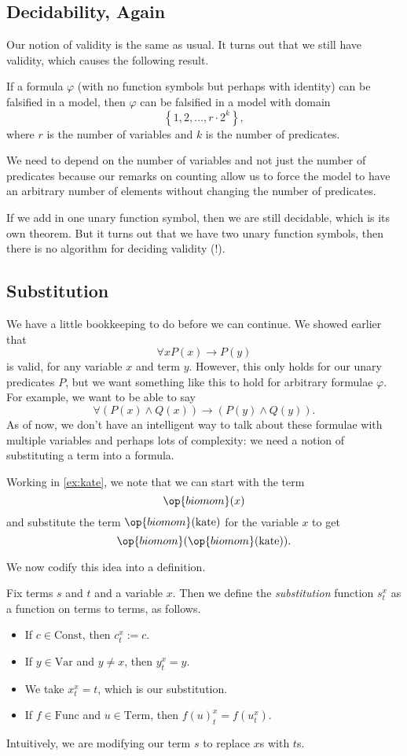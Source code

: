 \subsection{Decidability, Again}
Our notion of validity is the same as usual. It turns out that we still have validity, which causes the following result.
\begin{lemma}
	If a formula $\varphi$ (with no function symbols but perhaps with identity) can be falsified in a model, then $\varphi$ can be falsified in a model with domain
	\[\left\{1,2,\ldots,r\cdot 2^k\right\},\]
	where $r$ is the number of variables and $k$ is the number of predicates.
\end{lemma}
\begin{remark}
	We need to depend on the number of variables and not just the number of predicates because our remarks on counting allow us to force the model to have an arbitrary number of elements without changing the number of predicates.
\end{remark}
If we add in one unary function symbol, then we are still decidable, which is its own theorem. But it turns out that we have two unary function symbols, then there is no algorithm for deciding validity (!).

\subsection{Substitution}
We have a little bookkeeping to do before we can continue. We showed earlier that
\[\forall xP(x)\to P(y)\]
is valid, for any variable $x$ and term $y$. However, this only holds for our unary predicates $P$, but we want something like this to hold for arbitrary formulae $\varphi$. For example, we want to be able to say
\[\forall(P(x)\land Q(x))\to(P(y)\land Q(y)).\]
As of now, we don't have an intelligent way to talk about these formulae with multiple variables and perhaps lots of complexity: we need a notion of substituting a term into a formula.
\begin{example}
	Working in \autoref{ex:kate}, we note that we can start with the term
	\[\op{biomom}(x)\]
	and substitute the term $\op{biomom}(\mathrm{kate})$ for the variable $x$ to get
	\[\op{biomom}(\op{biomom}(\mathrm{kate})).\]
\end{example}
We now codify this idea into a definition.
\begin{definition}[Substitution]
	Fix terms $s$ and $t$ and a variable $x$. Then we define the \textit{substitution} function $s_t^x$ as a function on terms to terms, as follows.
	\begin{itemize}
		\item If $c\in\mathrm{Const}$, then $c^x_t:=c$.
		\item If $y\in\mathrm{Var}$ and $y\ne x$, then $y^x_t=y$.
		\item We take $x^x_t=t$, which is our substitution.
		\item If $f\in\mathrm{Func}$ and $u\in\mathrm{Term}$, then $f(u)_t^x=f(u_t^x)$.
	\end{itemize}
\end{definition}
Intuitively, we are modifying our term $s$ to replace $x$s with $t$s.
